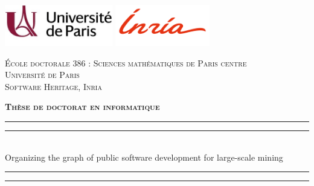 \begin{titlingpage}
\begin{SingleSpace}
\calccentering{\unitlength}

\includegraphics[height=1.8cm]{frontmatter/uni_paris.jpg}  \hfill
\includegraphics[height=1.8cm]{frontmatter/inria.png} \hfill
{}

\begin{center}

    \textsc{École doctorale 386 : Sciences mathématiques de Paris centre}\\
\vspace{2mm}
\textsc{Université de Paris}\\
\vspace{2mm}
\textsc{Software Heritage, Inria}\\

\vspace{4mm}

\textsc{\Large \textbf{Thèse de doctorat en informatique}}\\

\vspace*{2mm}

\rule[0.5ex]{\linewidth}{2pt}\vspace*{-\baselineskip}\vspace*{3.2pt}
\rule[0.5ex]{\linewidth}{1pt}\\[\baselineskip]
\vspace{-0.35cm}
{\huge Organizing the graph of public software development for large-scale mining}\\
\rule[0.5ex]{\linewidth}{1pt}\vspace*{-\baselineskip}\vspace*{3.4pt}
\rule[0.5ex]{\linewidth}{2pt}\\

\vspace{2mm}


\end{center}
\end{SingleSpace}
\end{titlingpage}
